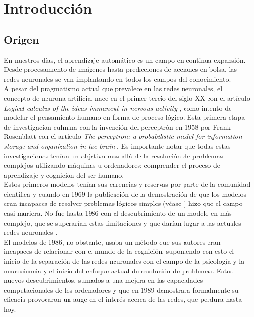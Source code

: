 
\chapter*{Introducción}

\section*{Origen}
En nuestros días, el aprendizaje automático es un campo en
continua expansión. Desde procesamiento de imágenes hasta predicciones de
acciones en bolsa, las redes neuronales se van implantando en todos los
campos del conocimiento. \\


A pesar del pragmatismo actual que prevalece en las redes 
neuronales, el concepto de neurona artificial nace en el primer tercio del siglo XX con el artículo  \textit{ Logical calculus of the ideas immanent in nervous activity} \cite{primer-articulo}, como
intento de modelar el pensamiento humano en forma de proceso lógico. Esta
primera etapa de investigación culmina con la invención del perceptrón en
1958 por Frank Rosenblatt con el artículo \textit{The perceptron: a probabilistic model for information storage and organization in the brain} \cite{rosenblatt1958perceptron}. Es importante notar que todas estas investigaciones
tenían un objetivo más allá de la resolución de problemas complejos utilizando
máquinas u ordenadores: comprender el proceso de aprendizaje y cognición del
ser humano.\\

Estos primeros modelos tenían sus carencias y reservas por parte
de la comunidad científica y cuando en 1969 la publicación de la demostración de que
los modelos eran incapaces de resolver problemas lógicos simples (véase \cite{minsky69perceptrons}) hizo que el
campo casi muriera. No fue hasta 1986 con el descubrimiento de un modelo en más complejo,
que se superarían estas limitaciones y que darían lugar a las actuales redes neuronales
\cite{10.5555/104279.104293}.\\

El modelos de 1986, no obstante, usaba un método que sus autores eran incapaces de
relacionar con el mundo de la cognición, suponiendo con esto el 
inicio de la separación de las redes neuronales con el campo de la psicología
y la neurociencia y el inicio del enfoque actual de resolución de problemas.
Estos nuevos descubrimientos, sumados a una mejora en las capacidades
computacionales de los ordenadores y que en 1989 demostrara formalmente su eficacia \cite{HORNIK1989359} provocaron un auge en el interés acerca de
las redes, que perdura hasta hoy.\\


